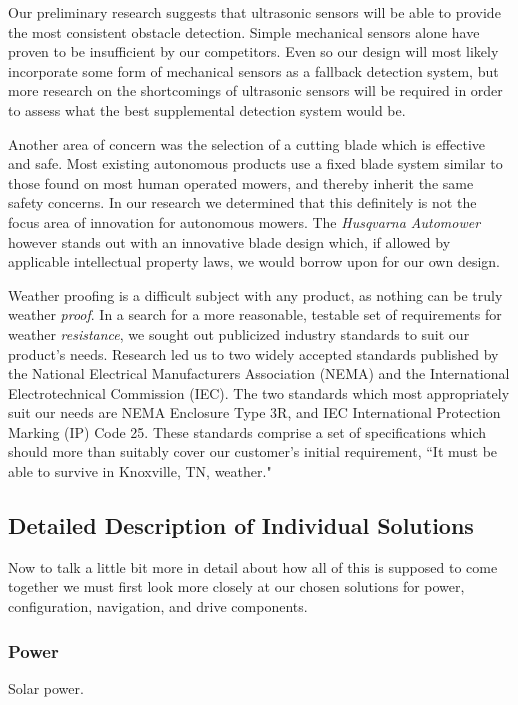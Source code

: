 \documentclass[12pt,letterpaper]{article}
\begin{document}
Our preliminary research suggests that ultrasonic sensors will be able to
provide the most consistent obstacle detection.  Simple mechanical sensors alone
have proven to be insufficient by our competitors. Even so our design will most
likely incorporate some form of mechanical sensors as a fallback detection
system, but more research on the shortcomings of ultrasonic sensors will be
required in order to assess what the best supplemental detection system would
be.

Another area of concern was the selection of a cutting blade which is effective
and safe.  Most existing autonomous products use a fixed blade system similar to
those found on most human operated mowers, and thereby inherit the same safety
concerns.  In our research we determined that this definitely is not the focus
area of innovation for autonomous mowers. The \textit{Husqvarna
Automower}\autocite{automower} however stands out with an innovative blade
design which, if allowed by applicable intellectual property laws, we would
borrow upon for our own design.

Weather proofing is a difficult subject with any product, as nothing can be
truly weather \textit{proof}.  In a search for a more reasonable, testable set
of requirements for weather \textit{resistance}, we sought out publicized
industry standards to suit our product's needs.  Research led us to two widely
accepted standards published by the National Electrical Manufacturers
Association (NEMA) and the International Electrotechnical Commission (IEC).  The
two standards which most appropriately suit our needs are NEMA Enclosure Type
3R\autocite{nema3r}, and IEC International Protection Marking (IP) Code
25.\autocite{ip25}  These standards comprise a set of specifications which
should more than suitably cover our customer's initial requirement, ``It must be
able to survive in Knoxville, TN, weather."

\subsection{Detailed Description of Individual Solutions}
Now to talk a little bit more in detail about how all of this is supposed to
come together we must first look more closely at our chosen solutions for power,
configuration, navigation, and drive components. 

\subsubsection{Power}
Solar power.
\end{document}
